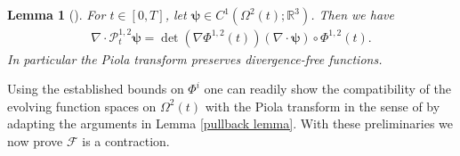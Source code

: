 \documentclass[a4paper]{amsart}
\numberwithin{equation}{section}
\newcommand{\grad}{\nabla}
\newcommand{\Div}{\nabla \cdot}
\theoremstyle{plain}
\newtheorem{lemma}[theorem]{Lemma}
\newcommand{\mbb}[1]{\mathbb{#1}}
\begin{document}
\begin{lemma}[{\cite[Lemma 2.8]{djurdjevac2023evolving}}]
	For $t \in [0,T]$, let $\boldsymbol{\psi} \in C^1(\Omega^2(t); \mbb{R}^3)$.
	Then we have
	\begin{align}
		\Div \mathcal{P}^{1,2}_t \boldsymbol{\psi} = \det(\grad\Phi^{1,2}(t))(\Div \boldsymbol{\psi}) \circ \Phi^{1,2}(t). \label{piola divergence}
	\end{align}
    In particular the Piola transform preserves divergence-free functions.
\end{lemma}
Using the established bounds on $\Phi^i$ one can readily show the compatibility of the evolving function spaces on $\Omega^2(t)$ with the Piola transform in the sense of \cite{alphonse2023function,alphonse2015abstract} by adapting the arguments in Lemma \ref{pullback lemma}.
With these preliminaries we now prove $\mathscr{F}$ is a contraction.
\end{document}
